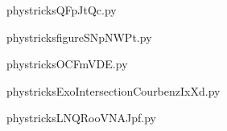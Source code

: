     

    \clearpage
    


    \newcommand{\CaptionFigQFpJtQc}{<+Type your caption here+>}
    \begin{center}
        
    \end{center}
    phystricksQFpJtQc.py

    

    \clearpage
    


    \newcommand{\CaptionFigfigureSNpNWPt}{<+Type your caption here+>}
    \begin{center}
        
    \end{center}
    phystricksfigureSNpNWPt.py

    

    \clearpage
    


    \newcommand{\CaptionFigOCFmVDE}{<+Type your caption here+>}
    \begin{center}
        
    \end{center}
    phystricksOCFmVDE.py

    

    \clearpage
    


    \newcommand{\CaptionFigExoIntersectionCourbenzIxXd}{<+Type your caption here+>}
    \begin{center}
        
    \end{center}
    phystricksExoIntersectionCourbenzIxXd.py

    

    \clearpage
    


    \newcommand{\CaptionFigLNQRooVNAJpf}{<+Type your caption here+>}
    \begin{center}
        
    \end{center}
    phystricksLNQRooVNAJpf.py

    

    \clearpage
    

